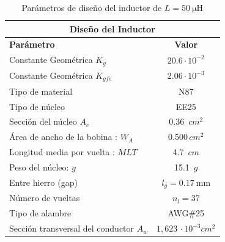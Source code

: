 \documentclass[]{article}
\begin{document}
	\begin{table}[H]
		\centering
		\renewcommand{\arraystretch}{1.3}
		\begin{tabular}{|l|c|}
			\hline
			\multicolumn{2}{|c|}{\textbf{Diseño del Inductor}} \\
			\hline
			\textbf{Parámetro} & \textbf{Valor} \\
			\hline
			Constante Geométrica $K_g$ & $20.6 \cdot 10^{-2}$\\
			\hline 
			Constante Geométrica $K_{gfe}$ & $2.06 \cdot 10^{-3}$\\
			\hline
			Tipo de material & N87 \\
			\hline
			Tipo de núcleo & EE25 \\
			\hline 
			Sección del núcleo $A_c$ & 0.36 $\, cm^2 $\\
			\hline 
			Área de ancho de la bobina : $ W_A$ & 0.500$\, cm^2 $\\
			\hline
			Longitud media por vuelta : $MLT $ & 4.7 $\, cm $ \\
			\hline 
			Peso del núcleo: $g$ & 15.1 $\, g$\\
			\hline
			Entre hierro (gap) & $l_g=\SI{0.17}{\milli\meter}$ \\
			\hline
			Número de vueltas & $n_l=37$ \\
			\hline
			Tipo de alambre & AWG\#25 \\
			\hline
			Sección transversal del conductor $A_w$ & $1,623 \, \cdot 10^{-3} cm^2$\\
			\hline
		\end{tabular}
		\caption{Parámetros de diseño del inductor de $L=\SI{50}{\micro\henry}$}
		\label{tab:diseno_inductor}
	\end{table}
	
	
	
	
	
\end{document}
